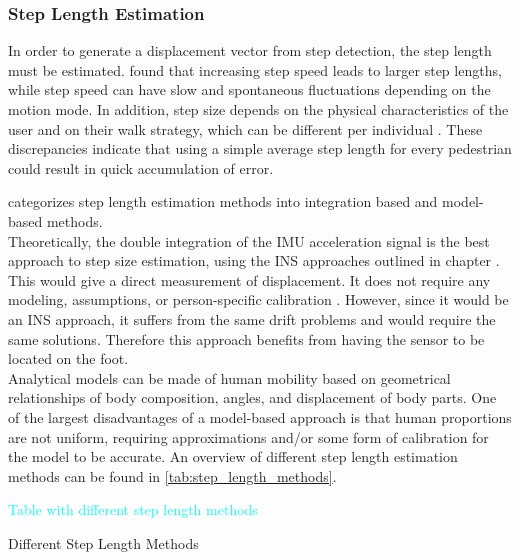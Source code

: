 

\subsubsection{Step Length Estimation}
In order to generate a displacement vector from step detection, the step length must be estimated. \citet{Collins2013a} found that increasing step speed leads to larger step lengths, while step speed can have slow and spontaneous fluctuations depending on the motion mode. In addition, step size depends on the physical characteristics of the user and on their walk strategy, which can be different per individual \cite{Diez2018}. These discrepancies indicate that using a simple average step length for every pedestrian could result in quick accumulation of error. 

\citet{Diez2018} categorizes step length estimation methods into integration based and model-based methods. \\
Theoretically, the double integration of the IMU acceleration signal is the best approach to step size estimation, using the INS approaches outlined in chapter . This would give a direct measurement of displacement. It does not require any modeling, assumptions, or person-specific calibration \cite{Diez2018}. However, since it would be an INS approach, it suffers from the same drift problems and would require the same solutions. Therefore this approach benefits from having the sensor to be located on the foot. \\
Analytical models can be made of human mobility based on geometrical relationships of body composition, angles, and displacement of body parts. One of the largest disadvantages of a model-based approach is that human proportions are not uniform, requiring approximations and/or some form of calibration for the model to be accurate.
An overview of different step length estimation methods can be found in \cref{tab:step_length_methods}.

\begin{table}[H]
	\centering
	\textcolor{cyan}{Table with different step length methods}
	\caption{Different Step Length Methods}
	\label{tab:step_length_methods}
\end{table}

